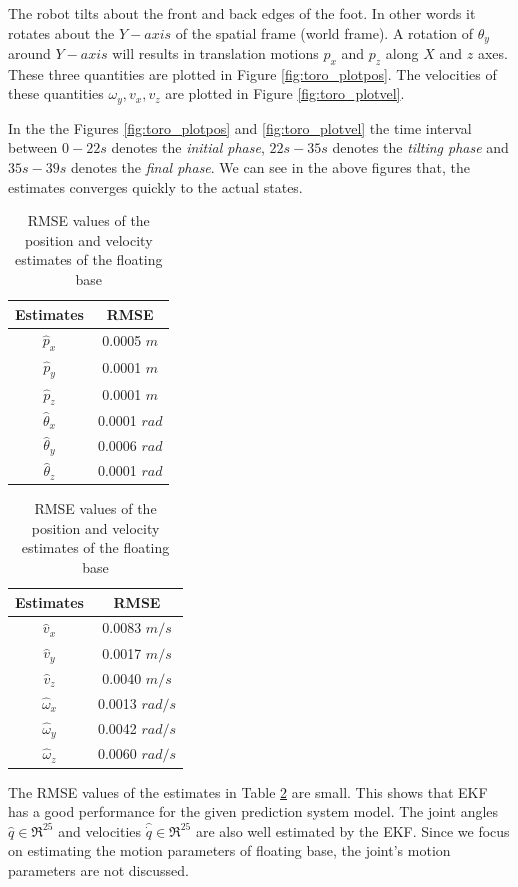 The robot tilts about the front and back edges of the foot. In other words it rotates about the $Y-axis$ of the spatial frame (world frame). A rotation of $\theta_y$ around $Y-axis$ will results in translation motions $p_x$ and $p_z$ along $X$ and $z$ axes. These three quantities are plotted in Figure \ref{fig:toro_plotpos}. The velocities of these quantities $\omega_y,v_x,v_z$ are plotted in Figure \ref{fig:toro_plotvel}.

In the the Figures \ref{fig:toro_plotpos} and \ref{fig:toro_plotvel} the time interval between $0-22s$ denotes the \emph{initial phase}, $22s-35s$ denotes the \emph{tilting phase} and $35s-39s$ denotes the \emph{final phase}. We can see in the above figures that, the estimates converges quickly to the actual states. 
\begin{table}[H]
    \centering
    \begin{tabular}{|c|c|}
    \hline
    Estimates &RMSE \\ \hline
    $\hat p_x$ &0.0005 $m$\\
    $\hat p_y$ &0.0001 $m$\\
    $\hat p_z$ &0.0001 $m$\\
    $\hat\theta_x$ &0.0001 $rad$\\
    $\hat\theta_y$ &0.0006 $rad$\\
    $\hat\theta_z$ &0.0001 $rad$\\ \hline
    \end{tabular} \hspace{1cm}
    \begin{tabular}{|c|c|}
    \hline
    Estimates &RMSE \\ \hline
    $\hat v_x$ &0.0083 $m/s$\\
    $\hat v_y$ &0.0017 $m/s$\\
    $\hat v_z$ &0.0040 $m/s$\\
    $\hat\omega_x$ &0.0013 $rad/s$\\
    $\hat\omega_y$ &0.0042 $rad/s$\\
    $\hat\omega_z$ &0.0060 $rad/s$\\ \hline
    \end{tabular}
    \caption{RMSE values of the position and velocity estimates of the floating base}
    \label{tab:toro_rmse}
\end{table}

The RMSE values of the estimates in Table \ref{tab:toro_rmse} are small. This shows that EKF has a good performance for the given prediction system model. The joint angles $ \hat q \in \Re^{25}$ and velocities $\hat \dot q \in \Re^{25}$ are also well estimated by the EKF. Since we focus on estimating the motion parameters of floating base, the joint's motion parameters are not discussed.

